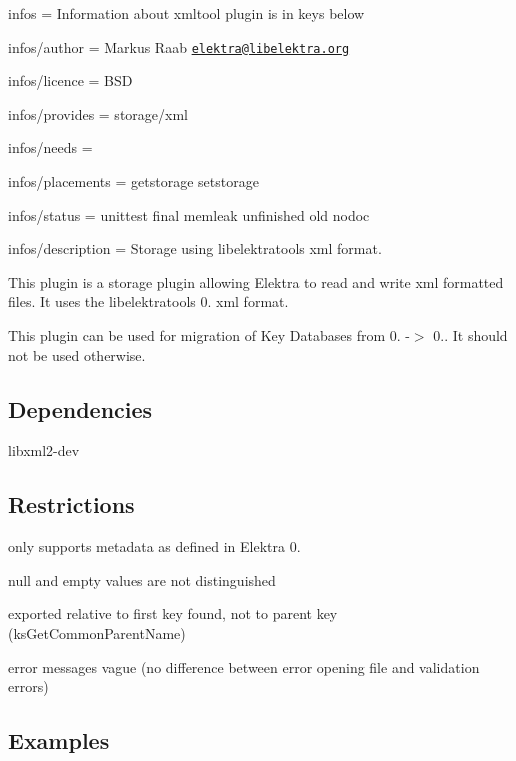 
\begin{DoxyItemize}
\item infos = Information about xmltool plugin is in keys below
\item infos/author = Markus Raab \href{mailto:elektra@libelektra.org}{\tt elektra@libelektra.\+org}
\item infos/licence = B\+SD
\item infos/provides = storage/xml
\item infos/needs =
\item infos/placements = getstorage setstorage
\item infos/status = unittest final memleak unfinished old nodoc
\item infos/description = Storage using libelektratools xml format.
\end{DoxyItemize}

This plugin is a storage plugin allowing Elektra to read and write xml formatted files. It uses the {\ttfamily libelektratools} 0. xml format.

This plugin can be used for migration of Key Databases from 0. -\/$>$ 0.. It should not be used otherwise.

\subsection*{Dependencies}


\begin{DoxyItemize}
\item {\ttfamily libxml2-\/dev}
\end{DoxyItemize}

\subsection*{Restrictions}


\begin{DoxyItemize}
\item only supports metadata as defined in Elektra 0.
\item null and empty values are not distinguished
\item exported relative to first key found, not to parent key (ks\+Get\+Common\+Parent\+Name)
\item error messages vague (no difference between error opening file and validation errors)
\end{DoxyItemize}

\subsection*{Examples}

